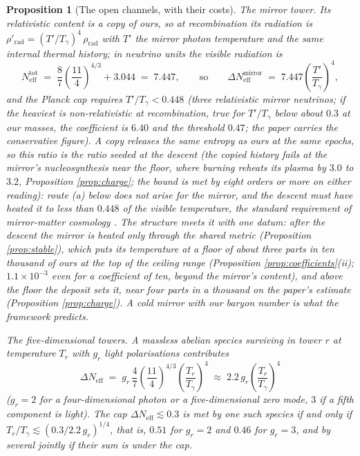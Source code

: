 \documentclass[11pt]{article}
\newtheorem{proposition}[theorem]{Proposition}
\theoremstyle{definition}
\newcommand{\Neff}{N_{\mathrm{eff}}}
\begin{document}
\begin{proposition}[The open channels, with their costs]\label{prop:openchannel}
\emph{The mirror tower.} Its relativistic content is a copy of ours, so at recombination its radiation is $\rho'_{\mathrm{rad}} = (T'/T_{\gamma})^{4}\,\rho_{\mathrm{rad}}$ with $T'$ the mirror photon temperature and the same internal thermal history; in neutrino units the visible radiation is
\[
\Neff^{\mathrm{tot}} \;=\; \frac{8}{7}\left(\frac{11}{4}\right)^{4/3} + 3.044 \;=\; 7.447, \qquad\text{so}\qquad \Delta\Neff^{\mathrm{mirror}} \;=\; 7.447\left(\frac{T'}{T_{\gamma}}\right)^{4},
\]
and the Planck cap requires $T'/T_{\gamma} < 0.448$ (three relativistic mirror neutrinos; if the heaviest is non-relativistic at recombination, true for $T'/T_{\gamma}$ below about $0.3$ at our masses, the coefficient is $6.40$ and the threshold $0.47$; the paper carries the conservative figure). A copy releases the same entropy as ours at the same epochs, so this ratio is the ratio \emph{seeded at the descent} (the copied history fails at the mirror's nucleosynthesis near the floor, where burning reheats its plasma by $3.0$ to $3.2$, Proposition \ref{prop:charge}; the bound is met by eight orders or more on either reading): route (a) below does not arise for the mirror, and the descent must have heated it to less than $0.448$ of the visible temperature, the standard requirement of mirror-matter cosmology \cite{FootMirror2004}. The structure meets it with one datum: after the descent the mirror is heated only through the shared metric (Proposition \ref{prop:stable}), which puts its temperature at a floor of about three parts in ten thousand of ours at the top of the ceiling range (Proposition \ref{prop:coefficients}(ii); $1.1 \times 10^{-3}$ even for a coefficient of ten, beyond the mirror's content), and above the floor the deposit sets it, near four parts in a thousand on the paper's estimate (Proposition \ref{prop:charge}). A cold mirror with our baryon number is what the framework predicts.

\emph{The five-dimensional towers.} A massless abelian species surviving in tower $r$ at temperature $T_{r}$ with $g_{r}$ light polarisations contributes
\[
\Delta\Neff \;=\; g_{r}\,\frac{4}{7}\left(\frac{11}{4}\right)^{4/3}\left(\frac{T_{r}}{T_{\gamma}}\right)^{4} \;\approx\; 2.2\,g_{r}\left(\frac{T_{r}}{T_{\gamma}}\right)^{4}
\]
($g_{r} = 2$ for a four-dimensional photon or a five-dimensional zero mode, $3$ if a fifth component is light). The cap $\Delta\Neff \lesssim 0.3$ is met by one such species if and only if $T_{r}/T_{\gamma} \lesssim (0.3/2.2\,g_{r})^{1/4}$, that is, $0.51$ for $g_{r} = 2$ and $0.46$ for $g_{r} = 3$, and by several jointly if their sum is under the cap.


\end{proposition}
\end{document}
